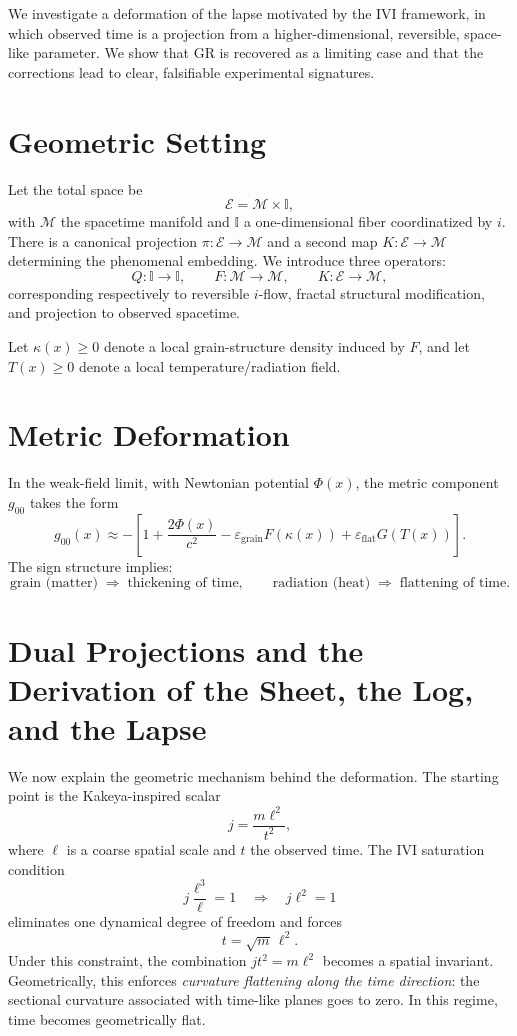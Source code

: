 \documentclass[11pt]{article}
\begin{document}
We investigate a deformation of the lapse motivated by the IVI framework, in which observed time is a projection from a higher-dimensional, reversible, space-like parameter. We show that GR is recovered as a limiting case and that the corrections lead to clear, falsifiable experimental signatures.

\section{Geometric Setting}

Let the total space be
\[
 \mathcal{E}=\mathcal{M}\times\mathbb{I},
\]
with $\mathcal{M}$ the spacetime manifold and $\mathbb{I}$ a one-dimensional fiber coordinatized by $i$. There is a canonical projection $\pi:\mathcal{E}\to\mathcal{M}$ and a second map $K:\mathcal{E}\to\mathcal{M}$ determining the phenomenal embedding. We introduce three operators:
\[
 Q:\mathbb{I}\to\mathbb{I},\qquad
 F:\mathcal{M}\to\mathcal{M},\qquad
 K:\mathcal{E}\to\mathcal{M},
\]
corresponding respectively to reversible $i$-flow, fractal structural modification, and projection to observed spacetime.

Let $\kappa(x)\ge 0$ denote a local grain-structure density induced by $F$, and let $T(x)\ge 0$ denote a local temperature/radiation field.

\section{Metric Deformation}

In the weak-field limit, with Newtonian potential $\Phi(x)$, the metric component $g_{00}$ takes the form
\begin{equation}
 g_{00}(x)\approx -\left[1+\frac{2\Phi(x)}{c^2}-\varepsilon_{\mathrm{grain}}F(\kappa(x))+\varepsilon_{\mathrm{flat}}G(T(x))\right].
 \label{eq:lapse_def}
\end{equation}
The sign structure implies:
\[
 \text{grain (matter)}\;\Rightarrow\;\text{thickening of time},\qquad
 \text{radiation (heat)}\;\Rightarrow\;\text{flattening of time}.
\]

\section{Dual Projections and the Derivation of the Sheet, the Log, and the Lapse}

We now explain the geometric mechanism behind the deformation. The starting point is the Kakeya-inspired scalar
\[
 j=\frac{m\ell^{2}}{t^{2}},
\]
where $\ell$ is a coarse spatial scale and $t$ the observed time. The IVI saturation condition
\[
 j\frac{\ell^{3}}{\ell}=1\quad\Longrightarrow\quad j\ell^{2}=1
\]
eliminates one dynamical degree of freedom and forces
\[
 t=\sqrt{m}\,\ell^{2}.
\]
Under this constraint, the combination $jt^{2}=m\ell^{2}$ becomes a spatial invariant. Geometrically, this enforces \emph{curvature flattening along the time direction}: the sectional curvature associated with time-like planes goes to zero. In this regime, time becomes geometrically flat.
\end{document}
